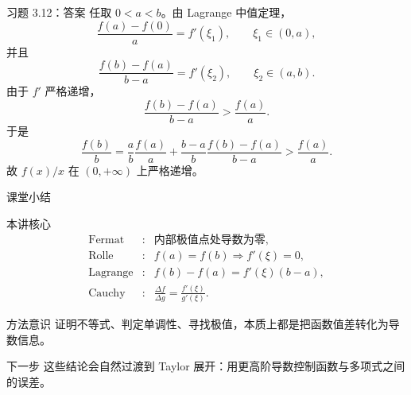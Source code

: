 \documentclass[aspectratio=169,10pt]{ctexbeamer}
\begin{document}
\begin{frame}{习题 3.12：答案}
\small
任取 $0<a<b$。由 Lagrange 中值定理，
\[
  \frac{f(a)-f(0)}{a}=f'(\xi_1),\qquad \xi_1\in(0,a),
\]
并且
\[
  \frac{f(b)-f(a)}{b-a}=f'(\xi_2),\qquad \xi_2\in(a,b).
\]
由于 $f'$ 严格递增，
\[
  \frac{f(b)-f(a)}{b-a}>\frac{f(a)}a.
\]
于是
\[
  \frac{f(b)}b
  =
  \frac{a}{b}\frac{f(a)}a+
  \frac{b-a}{b}\frac{f(b)-f(a)}{b-a}
  >
  \frac{f(a)}a.
\]
故 $f(x)/x$ 在 $(0,+\infty)$ 上严格递增。
\end{frame}

\begin{frame}{课堂小结}
\small
\begin{block}{本讲核心}
\[
\begin{array}{rcl}
\text{Fermat} &:& \text{内部极值点处导数为零},\\
\text{Rolle} &:& f(a)=f(b)\Rightarrow f'(\xi)=0,\\
\text{Lagrange} &:& f(b)-f(a)=f'(\xi)(b-a),\\
\text{Cauchy} &:& \displaystyle \frac{\Delta f}{\Delta g}
                 =\frac{f'(\xi)}{g'(\xi)}.
\end{array}
\]
\end{block}
\begin{block}{方法意识}
证明不等式、判定单调性、寻找极值，本质上都是把函数值差转化为导数信息。
\end{block}
\begin{alertblock}{下一步}
这些结论会自然过渡到 Taylor 展开：用更高阶导数控制函数与多项式之间的误差。
\end{alertblock}
\end{frame}
\end{document}
